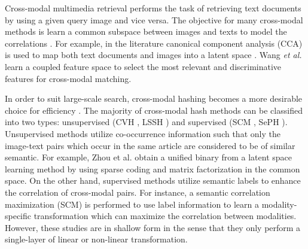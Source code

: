 \documentclass[10pt,journal,twocolumn]{IEEEtran}
\begin{document}
Cross-modal multimedia retrieval performs the task of retrieving text documents by using a given query image and vice versa. The objective for many cross-modal methods is learn a common subspace between images and texts to model the correlations \cite{Cross-modal-MM2010,Coupled-modal,Joint-feature-subspace}. For example, in the literature canonical component analysis (CCA) is used to map both text documents and images into a latent space \cite{Cross-modal-MM2010}. Wang \textit{et al.} \cite{Coupled-modal} learn a coupled feature space to select the most relevant and discriminative features for cross-modal matching.

In order to suit large-scale search, cross-modal hashing becomes a more desirable choice for efficiency \cite{LBMCH}. The majority of cross-modal hash methods can be classified into two types: unsupervised (CVH \cite{CVH}, LSSH \cite{LSSH}) and supervised (SCM \cite{SCM}, SePH \cite{Semantics-hash}). Unsupervised methods utilize co-occurrence information such that only the image-text pairs which occur in the same article are considered to be of similar semantic. For example, Zhou et al. \cite{LSSH} obtain a unified binary from a latent space learning method by using sparse coding and matrix factorization in the common space. On the other hand, supervised methods utilize semantic labels to enhance the correlation of cross-modal pairs. For instance, a semantic correlation maximization (SCM) is performed to use label information to learn a modality-specific transformation which can maximize the correlation between modalities. However, these studies are in shallow form in the sense that they only perform a single-layer of linear or non-linear transformation.
\end{document}
